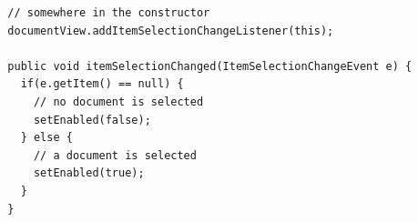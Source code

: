 \begin{verbatim}
  // somewhere in the constructor
  documentView.addItemSelectionChangeListener(this);

  public void itemSelectionChanged(ItemSelectionChangeEvent e) {
    if(e.getItem() == null) {
      // no document is selected
      setEnabled(false);
    } else {
      // a document is selected
      setEnabled(true);
    }
  }
\end{verbatim}





% 
%